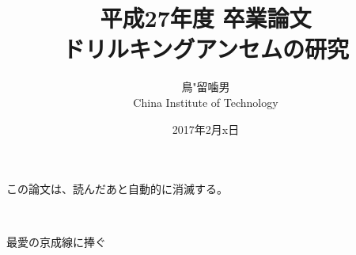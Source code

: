 \documentclass[a4paper,11pt]{jsbook}
\begin{document}
\title{平成27年度 卒業論文\\
ドリルキングアンセムの研究}

\author{鳥"留噛男 \\
China Institute of Technology}

\date{2017年2月x日}

\maketitle

この論文は、読んだあと自動的に消滅する。
\clearpage

\thispagestyle{empty}
\vfil
\ \\
\vspace{15em}
\begin{center}
	{\Large 最愛の京成線に捧ぐ }
\end{center}



\tableofcontents



\cleardoublepage
{}






\appendix





\newpage
\printindex
\end{document}
